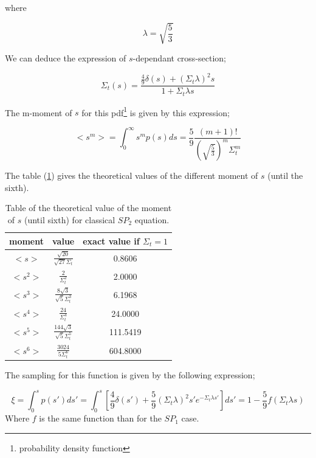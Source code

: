 \documentclass[a4paper, 12pt]{report}
\newcommand{\bl}{\big<}
\newcommand{\bg}{\big>}
\begin{document}
where

\begin{equation}
\lambda = \sqrt{\frac{5}{3}}
\end{equation}

We can deduce the expression of $s$-dependant cross-section;

\begin{equation}
\Sigma_t(s) = \frac{\frac{4}{9}\delta(s)+ (\Sigma_t \lambda)^2s}{1+\Sigma_t \lambda s}
\end{equation}

The	m-moment of $s$ for this pdf\footnote{probability density function} is given by this expression;

\begin{equation}
\bl s^m \bg = \int_0^\infty s^m p(s)ds =  \frac{5}{9}\frac{(m+1)!}{(\sqrt{\frac{5}{3}})^m \Sigma_t^m}
\end{equation}

The table (\ref{momentsp2}) gives the theoretical values of the different moment of $s$ (until the sixth).
\begin{center}
\begin{table}
\begin{center}
\begin{tabular}{|c|c|c|}
\hline
moment & value & exact value if $\Sigma_t = 1$ \\ \hline
$\bl s \bg$ &$ \frac{\sqrt{20}}{\sqrt{27}\Sigma_t}$ & 0.8606  \\ \hline
$\bl s^2 \bg$ & $\frac{2}{\Sigma_t^2}$ & 2.0000 \\ \hline
$\bl s^3 \bg$ &$ \frac{8\sqrt{3}}{\sqrt{5}\Sigma_t^3}$ & 6.1968\\ \hline
$\bl s^4 \bg$ &$ \frac{24}{ \Sigma_t^4}$ & 24.0000\\ \hline
$\bl s^5 \bg$ &$ \frac{144\sqrt{3}}{\sqrt{5}\Sigma_t^5}$ & 111.5419 \\ \hline
$\bl s^6 \bg$ &$ \frac{3024}{5 \Sigma_t^6}$ & 604.8000 \\ \hline
\end{tabular}
\caption{\label{momentsp2} Table of the theoretical value of the moment of $s$ (until sixth) for classical $SP_2$ equation. }
\end{center}
\end{table}
\end{center}

The sampling for this function is given by the following expression;

\begin{equation}
\xi = \int_0^s p(s')ds' = \int_0^s \left[ \frac{4}{9}\delta(s') + \frac{5}{9}(\Sigma_t \lambda)^2s'e^{-\Sigma_t \lambda s'} \right]ds' = 1 - \frac{5}{9}f(\Sigma_t \lambda s)
\end{equation}
Where $f$ is the same function than for the $SP_1$ case.
\end{document}
